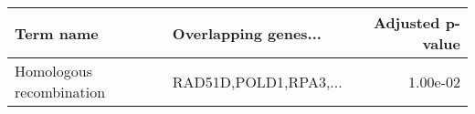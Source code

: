\begin{tabular}{llr}
\toprule
               Term name &  Overlapping genes... &  Adjusted p-value \\
\midrule
Homologous recombination & RAD51D,POLD1,RPA3,... &          1.00e-02 \\
\bottomrule
\end{tabular}
